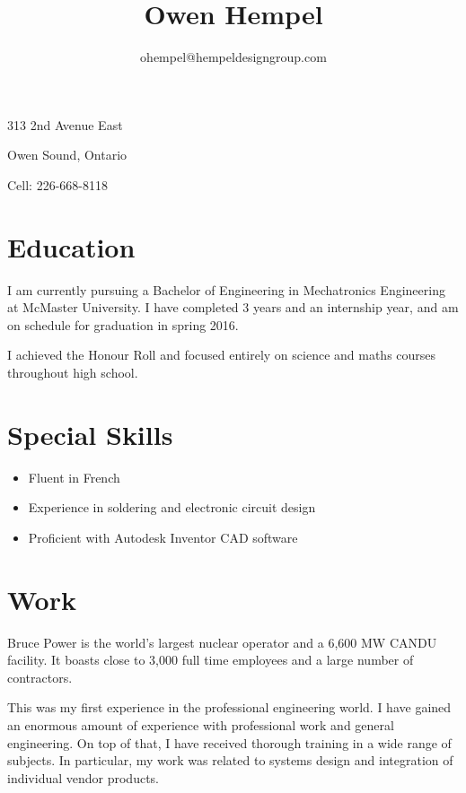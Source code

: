 \documentclass{curriculumVitae}
\title{\bfseries\Huge Owen Hempel}
\author{ohempel@hempeldesigngroup.com}
\date{}
\begin{document}
\maketitle

\vspace{1em}
\begin{minipage}[ht]{0.48\textwidth}
313 2nd Avenue East

Owen Sound, Ontario
\end{minipage}
\begin{minipage}[ht]{0.48\textwidth}
Cell: 226-668-8118
\end{minipage}


\section{Education}
I am currently pursuing a Bachelor of Engineering in Mechatronics Engineering at McMaster University. I have completed 3 years and an internship year, and am on schedule for graduation in spring 2016.

I achieved the Honour Roll and focused entirely on science and maths courses throughout high school.
\section{Special Skills}
\begin {itemize}
\item{Fluent in French}
\item{Experience in soldering and electronic circuit design} 
\item{Proficient with Autodesk Inventor CAD software}
\end{itemize}

\section{Work}
Bruce Power is the world's largest nuclear operator and a 6,600 MW CANDU facility. It boasts close to 3,000 full time employees and a large number of contractors.

This was my first experience in the professional engineering world. I have gained an enormous amount of experience with professional work and general engineering. On top of that, I have received thorough training in a wide range of subjects. In particular, my work was related to systems design and integration of individual vendor products.
\end{document}
